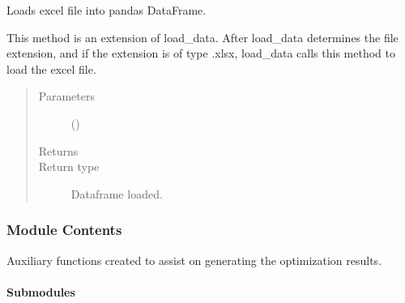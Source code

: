 \documentclass[letterpaper,10pt,english]{sphinxmanual}
\begin{document}
\begin{fulllineitems}
\label{\detokenize{source/optimization.opt_tools:optimization.opt_tools.load_data.load_excel}}
Loads excel file into pandas DataFrame.

This method is an extension of load\_data.
After load\_data determines the file extension,
and if the extension is of type .xlsx, load\_data
calls this method to load the excel file.
\begin{quote}\begin{description}
\item[{Parameters}] \leavevmode
\sphinxstyleliteralstrong{\sphinxupquote{(}}\sphinxstyleliteralstrong{\sphinxupquote{)}} () \textendash{} 

\item[{Returns}] \leavevmode
{}

\item[{Return type}] \leavevmode
Dataframe loaded.

\end{description}\end{quote}

\end{fulllineitems}



\subsubsection{Module Contents}
\label{\detokenize{source/optimization.opt_tools:module-optimization.opt_tools}}\label{\detokenize{source/optimization.opt_tools:module-contents}}
Auxiliary functions created to assist on generating the optimization results.


\paragraph{Submodules}
\label{\detokenize{source/optimization.opt_tools:submodules}}
\end{document}
